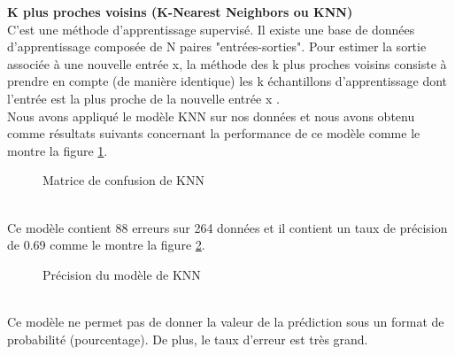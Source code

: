 \textbf{K plus proches voisins (K-Nearest Neighbors ou KNN)} \\
C'est une méthode d’apprentissage supervisé. Il existe une base de données d'apprentissage composée de N paires "entrées-sorties". Pour estimer la sortie associée à une nouvelle entrée x, la méthode des k plus proches voisins consiste à prendre en compte (de manière identique) les k échantillons d'apprentissage dont l'entrée est la plus proche de la nouvelle entrée x \cite{KNN}.\\
   Nous avons appliqué le modèle KNN sur nos données et nous avons obtenu comme résultats suivants concernant la performance de ce modèle comme le montre la figure \ref{fig:ConfusionKNN}.
     \begin{figure}[htpb]
    \centering
    \caption{Matrice de confusion de KNN}
    \label{fig:ConfusionKNN}
    \end{figure}
    \\
Ce modèle contient 88 erreurs sur 264 données et il contient un taux de précision de 0.69 comme le montre la figure \ref{fig:ConfusionMatrixKNNPrecision}.
   \begin{figure}[htpb]
    \centering
    \caption{Précision du modèle de KNN}
    \label{fig:ConfusionMatrixKNNPrecision}
    \end{figure}
    \\
    Ce modèle ne permet pas de donner la valeur de la prédiction sous un format de probabilité (pourcentage). De plus, le taux d’erreur est très grand.
    \newpage
    


